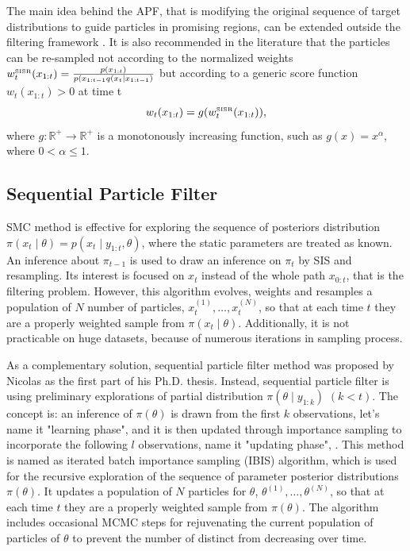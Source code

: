 The main idea behind the APF, that is modifying the original sequence of target distributions to guide particles in promising regions, can be extended outside the filtering framework \cite{JOHANSEN20081498}. It is also recommended in the literature \cite{liu2008monte} that the particles can be re-sampled not according to the normalized weights $w_t^{\mbox{\tiny SISR}}(x_{1:t})=\frac{p(x_{1:t})}{ p(x_{1:t-1}q(x_t\mid x_{1:t-1})  }$  but according to a generic score function $w_t(x_{1:t})>0$ at time t
\begin{equation*}
w_t(x_{1:t}) = g(w_t^{\mbox{\tiny SISR}}(x_{1:t})),
\end{equation*}
where $g: \mathbb{R}^+\rightarrow \mathbb{R}^+$ is a monotonously increasing function, such as $g(x)=x^\alpha$, where $0<\alpha\leq 1$. 



\subsection{Sequential Particle Filter}


SMC method is effective for exploring the sequence of posteriors distribution  $\pi(x_t\mid\theta) = p(x_t\mid y_{1:t},\theta)$, where the static parameters are
treated as known. An inference about $\pi_{t-1}$ is used to draw an inference on $\pi_t$ by SIS and resampling. Its interest is focused on $x_t$ instead of the whole path $x_{0:t}$, that is the filtering problem. However, this algorithm evolves, weights and resamples a population of $N$ number of particles, $x_t^{(1)},\dots,x_t^{(N)}$, so that at each time $t$ they are a properly weighted sample from $\pi(x_t \mid \theta)$. Additionally, it is not practicable on huge datasets, because of numerous iterations in sampling process. 

As a complementary solution, sequential particle filter method was proposed by Nicolas \cite{chopin2002sequential} as the first part of his Ph.D. thesis. Instead, sequential particle filter is using preliminary explorations of partial distribution $\pi(\theta\mid y_{1:k})$ $(k<t)$. The concept is: an inference of $\pi(\theta)$ is drawn from the first $k$ observations, let's name it "learning phase", and it is then updated through importance sampling to incorporate the following $l$ observations, name it "updating phase", \cite{chopin2002sequential}.  This method is named as iterated batch importance sampling (IBIS) algorithm, which is used for the recursive exploration of the sequence of parameter posterior distributions $\pi(\theta)$. It updates a population of $N$ particles for $\theta$, $\theta^{(1)}, \dots, \theta^{(N)}$, so that at each time $t$ they are a properly weighted sample from $\pi(\theta)$. The algorithm includes occasional MCMC steps for rejuvenating the current population of particles of $\theta$  to prevent the number of distinct from decreasing over time. 

